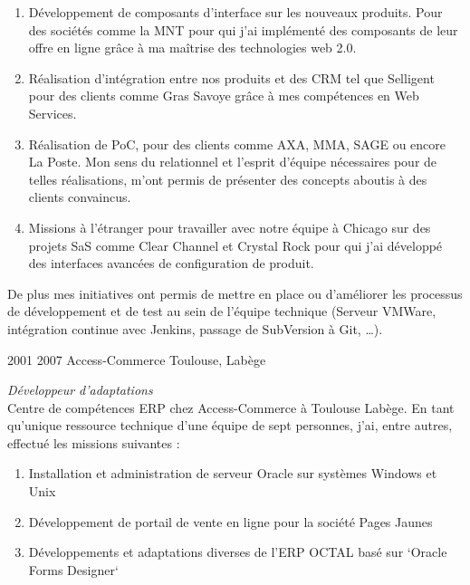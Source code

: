 \documentclass{friggeri-cv} 	%
\begin{document}
\begin{entrylist}
{\begin{enumerate}
\item Développement de composants d’interface sur les nouveaux produits. Pour des sociétés comme la MNT pour qui j’ai implémenté des composants de leur offre en ligne grâce à ma maîtrise des technologies web 2.0.
\item Réalisation d’intégration entre nos produits et des CRM tel que Selligent pour des clients comme Gras Savoye grâce à mes compétences en Web Services.
\item Réalisation de PoC, pour des clients comme AXA, MMA, SAGE ou encore La Poste. Mon sens du relationnel et l’esprit d’équipe nécessaires pour de telles réalisations, m’ont permis de présenter des concepts aboutis à des clients convaincus.
\item Missions à l’étranger pour travailler avec notre équipe à Chicago sur des projets SaS comme Clear Channel et Crystal Rock pour qui j'ai développé des interfaces avancées de configuration de produit.
\end{enumerate}

De plus mes initiatives ont permis de mettre en place ou d’améliorer les processus de développement et de test au sein de l’équipe technique (Serveur VMWare, intégration continue avec Jenkins, passage de SubVersion à Git, \ldots).
\
}
\end{entrylist}
\begin{entrylist}
\entry
{2001  2007}
{Access-Commerce}
{Toulouse, Labège}
{\vspace{0.2cm}\emph{Développeur d'adaptations}  \\
Centre de compétences ERP chez Access-Commerce à Toulouse Labège.
En tant qu’unique ressource technique d'une équipe de sept personnes, j’ai, entre autres, effectué les
missions suivantes :
\begin{enumerate}
\item Installation et administration de serveur Oracle sur systèmes Windows et Unix
\item Développement de portail de vente en ligne pour la société Pages Jaunes
\item Développements et adaptations diverses de l’ERP OCTAL basé sur `Oracle Forms Designer`
\end{enumerate}
}
\end{entrylist}
\end{document}
